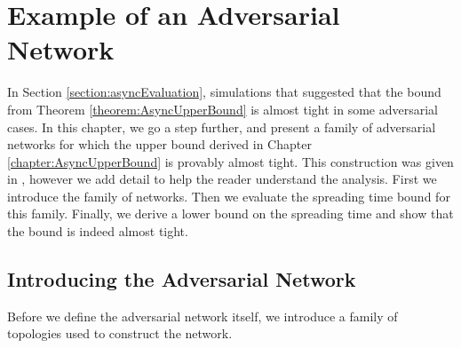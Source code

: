 \chapter{Example of an Adversarial Network}\label{chapter:asyncBoundTight}


In Section \ref{section:asyncEvaluation}, simulations that suggested that the bound from Theorem \ref{theorem:AsyncUpperBound} is almost tight in some adversarial cases. In this chapter, we go a step further, and present a family of adversarial networks for which the upper bound derived in Chapter \ref{chapter:AsyncUpperBound} is provably almost tight. This construction was given in \cite{asyncPaper}, however we add detail to help the reader understand the analysis. First we introduce the family of networks. Then we evaluate the spreading time bound for this family. Finally, we derive a lower bound on the spreading time and show that the bound is indeed almost tight.

\section{Introducing the Adversarial Network}

Before we define the adversarial network itself, we introduce a family of topologies used to construct the network.

